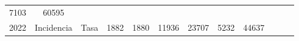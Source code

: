 \begin{tabular}{ccc|cccccc|lll}
		\multicolumn{1}{c|}{\cellcolor[HTML]{C1EFC0}7103} &
		\cellcolor[HTML]{C1EFC0}60595 &
		&
		&
		\\ \cline{3-9}
		\multicolumn{1}{|c|}{\multirow{-5}{*}{\cellcolor[HTML]{C1EFC0}2022}} &
		\multicolumn{1}{c|}{\cellcolor[HTML]{C1EFC0}Incidencia} &
		\cellcolor[HTML]{C1EFC0}Tasa &
		\multicolumn{1}{c|}{\cellcolor[HTML]{C1EFC0}1882} &
		\multicolumn{1}{c|}{\cellcolor[HTML]{C1EFC0}1880} &
		\multicolumn{1}{c|}{\cellcolor[HTML]{C1EFC0}11936} &
		\multicolumn{1}{c|}{\cellcolor[HTML]{C1EFC0}23707} &
		\multicolumn{1}{c|}{\cellcolor[HTML]{C1EFC0}5232} &
		\cellcolor[HTML]{C1EFC0}44637 &
		&
		&
		\\ \cline{1-1} \cline{3-9}
	\end{tabular}